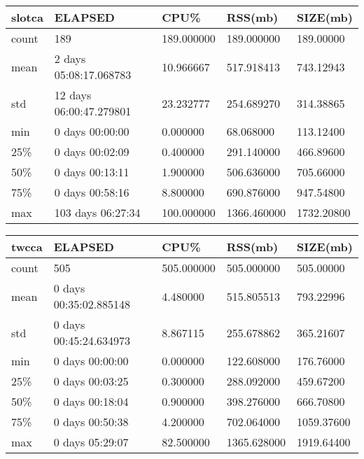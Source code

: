 \documentclass{article}
\begin{document}
\begin{table}[H]
\begin{tabular}{|l|l|l|l|l|}
\hline slotca&    ELAPSED&   CPU\%&  RSS(mb)&   SIZE(mb) \\
\hline count&   189& 189.000000&  189.000000&  189.00000 \\
\hline mean&  2 days 05:08:17.068783&  10.966667&  517.918413&  743.12943 \\
\hline std&  12 days 06:00:47.279801&  23.232777&  254.689270&  314.38865 \\
\hline min&   0 days 00:00:00&  0.000000&  68.068000&  113.12400 \\
\hline 25\%&   0 days 00:02:09&  0.400000&  291.140000&  466.89600 \\
\hline 50\%&   0 days 00:13:11&  1.900000&  506.636000&  705.66000 \\
\hline 75\%&   0 days 00:58:16&  8.800000&  690.876000&  947.54800 \\
\hline max&  103 days 06:27:34& 100.000000& 1366.460000& 1732.20800 \\
\hline 
\end{tabular}
\label{TABLE-SessionSizeslotca}
\end{table}

\begin{table}[H]
\begin{tabular}{|l|l|l|l|l|}
\hline twcca& ELAPSED&   CPU\%&  RSS(mb)&   SIZE(mb) \\
\hline count&    505& 505.000000&  505.000000&  505.00000 \\
\hline mean&  0 days 00:35:02.885148&  4.480000&  515.805513&  793.22996 \\
\hline std&  0 days 00:45:24.634973&  8.867115&  255.678862&  365.21607 \\
\hline min&   0 days 00:00:00&  0.000000&  122.608000&  176.76000 \\
\hline 25\%&   0 days 00:03:25&  0.300000&  288.092000&  459.67200 \\
\hline 50\%&   0 days 00:18:04&  0.900000&  398.276000&  666.70800 \\
\hline 75\%&   0 days 00:50:38&  4.200000&  702.064000& 1059.37600 \\
\hline max&   0 days 05:29:07&  82.500000& 1365.628000& 1919.64400 \\
\hline 
\end{tabular}
\label{TABLE-SessionSizetwcca}
\end{table}
\end{document}
